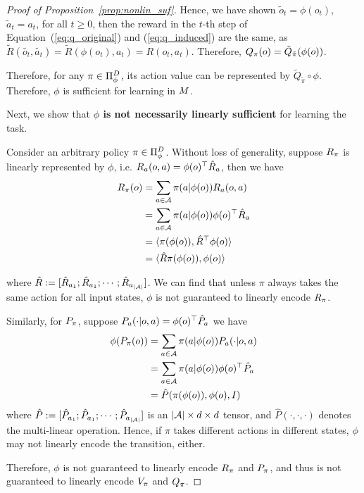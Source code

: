 \begin{proof}[Proof of Proposition~\ref{prop:nonlin_suf}]
Hence, we have shown $\tilde{o}_t = \phi(o_t)$, $\tilde{a}_t=a_t$, for all $t\geq 0$, then the reward in the $t$-th step of Equation~(\ref{eq:q_original}) and (\ref{eq:q_induced}) are the same, as $\tilde{R}(\tilde{o_t},\tilde{a_t}) = \tilde{R}(\phi(o_t),a_t) = R(o_t,a_t)$. Therefore, $Q_\pi(o)=\tilde{Q}_{\tilde{\pi}}(\phi(o))$.

Therefore, for any $\pi\in\Pi_{\phi}^D$, its action value can be represented by $\tilde{Q}_{\tilde{\pi}}\circ\phi$. Therefore, $\phi$ is sufficient for learning in $M$.


Next, we show that \textbf{$\phi$ is not necessarily linearly sufficient} for learning the task. 

Consider an arbitrary policy $\pi\in\Pi_{\phi}^D$. Without loss of generality, suppose $R_\pi$ is linearly represented by $\phi$, i.e. $R_a(o,a) = \phi(o)^\top \hat{R}_a$, then we have
\begin{align*}
    R_\pi(o) &= \sum_{a\in\mathcal{A}} \pi(a|\phi(o)) R_a(o,a) \\
    &= \sum_{a\in\mathcal{A}} \pi(a|\phi(o)) \phi(o)^\top \hat{R}_a \\
    &= \langle \pi(\phi(o)), \hat{R}^\top \phi(o) \rangle \\
    &= \langle \hat{R} \pi(\phi(o)), \phi(o) \rangle
\end{align*}

where $\hat{R}:=[\hat{R}_{a_1};\hat{R}_{a_1};\cdots;\hat{R}_{a_{|\mathcal{A}|}} ]$. We can find that unless $\pi$ always takes the same action for all input states, $\phi$ is not guaranteed to linearly encode $R_\pi$.


Similarly, for $P_\pi$, suppose $P_a(\cdot|o,a)=\phi(o)^\top \hat{P}_a$ we have
\begin{align*}
    \phi(P_\pi(o)) &= \sum_{a\in\mathcal{A}} \pi(a|\phi(o)) P_a(\cdot|o,a) \\
    &= \sum_{a\in\mathcal{A}} \pi(a|\phi(o)) \phi(o)^\top \hat{P}_a \\
    &= \hat{P}(\pi(\phi(o)), \phi(o), I) 
\end{align*}
where $\hat{P}:=[\hat{P}_{a_1};\hat{P}_{a_1};\cdots;\hat{P}_{a_{|\mathcal{A}|}} ]$ is an $|\mathcal{A}|\times d \times d$ tensor, and $\hat{P}(\cdot,\cdot,\cdot)$ denotes the multi-linear operation. Hence, if $\pi$ takes different actions in different states, $\phi$ may not linearly encode the transition, either.

Therefore, $\phi$ is not guaranteed to linearly encode $R_\pi$ and $P_\pi$, and thus is not guaranteed to linearly encode $V_\pi$ and $Q_\pi$. 

\end{proof}


